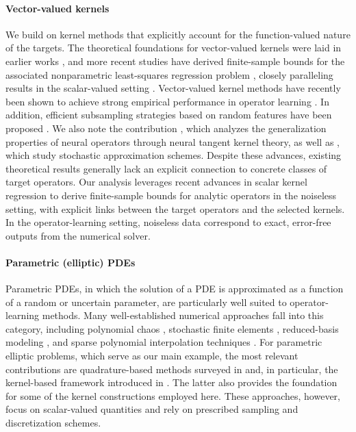 \documentclass[11pt]{article}
\numberwithin{equation}{section}
\theoremstyle{plain}
\theoremstyle{definition}
\theoremstyle{remark}
\begin{document}
\paragraph{Vector-valued kernels}
We build on kernel methods that explicitly account for the function-valued
nature of the targets. The theoretical foundations for vector-valued kernels
were laid in earlier works
\cite{senkene1973hilbert, carmeli2006vector, carmeli2010vector,
kadri2016operator}, and more recent studies have derived finite-sample bounds
for the associated nonparametric least-squares regression problem
\cite{mollenhauer2022learning, li2024towards, meunier2024optimal}, closely
paralleling results in the scalar-valued setting
\cite{caponnetto2007optimal, smale2007learning, bauer2007regularization}.
Vector-valued kernel methods have recently been shown to achieve strong
empirical performance in operator learning
\cite{batlle2024kernel, batlle2025error, jalalian2025data,
chen2021solving}. In addition, efficient subsampling strategies based on
random features have been proposed
\cite{nelsen2021random, lanthaler2024error, dunbar2025hyperparameter}.
We also note the contribution
\cite{nguyen2024optimal}, which analyzes the generalization properties of
neural operators through neural tangent kernel theory, as well as
\cite{shi2024learning, yang2025learning, yang2025kernel}, which study
stochastic approximation schemes. Despite these advances, existing theoretical
results generally lack an explicit connection to concrete classes of target
operators. Our analysis leverages recent advances in scalar kernel regression
\cite{dommel2024bound, dommel2025approximation} to derive finite-sample
bounds for analytic operators in the noiseless setting, with explicit links
between the target operators and the selected kernels. In the operator-learning
setting, noiseless data correspond to exact, error-free outputs from the
numerical solver.

\paragraph{Parametric (elliptic) PDEs}
Parametric PDEs, in which the solution of a PDE is approximated as a function
of a random or uncertain parameter, are particularly well suited to
operator-learning methods. Many well-established numerical approaches fall
into this category, including polynomial chaos
\cite{ghanem2003stochastic}, stochastic finite elements
\cite{ghanem2003stochastic}, reduced-basis modeling
\cite{hesthaven2016certified, lucia2004reduced}, and sparse polynomial
interpolation techniques \cite{chkifa2013sparse, chkifa2014high}. For
parametric elliptic problems, which serve as our main example, the most
relevant contributions are quadrature-based methods surveyed in
\cite{kuo2016application} and, in particular, the kernel-based framework
introduced in \cite{griebel2017reproducing}. The latter also provides the
foundation for some of the kernel constructions employed here. These
approaches, however, focus on scalar-valued quantities and rely on prescribed
sampling and discretization schemes.
\end{document}
